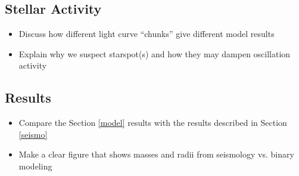 \subsection{Stellar Activity}
\begin{itemize}
\item Discuss how different light curve ``chunks'' give different model results
\item Explain why we suspect starspot(s) and how they may dampen oscillation activity
\end{itemize}

\subsection{Results}\label{results}
\begin{itemize}
\item Compare the Section \ref{model} results with the \citet{gau14} results described in Section \ref{seismo}
\item Make a clear figure that shows masses and radii from seismology vs. binary modeling
\end{itemize}
